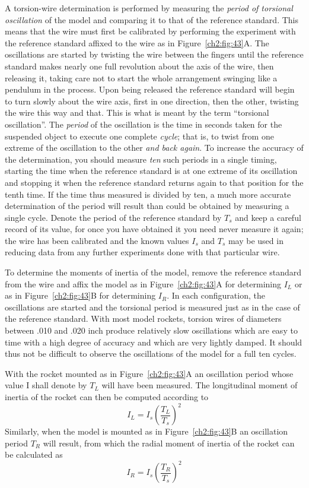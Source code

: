 A torsion-wire determination is performed by measuring the \emph{period of
torsional oscillation} of the model and comparing it to that of the reference
standard. This means that the wire must first be calibrated by performing the
experiment with the reference standard affixed to the wire as in
Figure~\ref{ch2:fig:43}A. The oscillations are started by twisting the wire
between the fingers until the reference standard makes nearly one full
revolution about the axis of the wire, then releasing it, taking care not to
start the whole arrangement swinging like a pendulum in the process. Upon
being released the reference standard will begin to turn slowly about the wire
axis, first in one direction, then the other, twisting the wire this way and
that. This is what is meant by the term ``torsional oscillation''. The
\emph{period} of the oscillation is the time in seconds taken for the
suspended object to execute one complete \emph{cycle}; that is, to twist from
one extreme of the oscillation to the other \emph{and back again}. To increase
the accuracy of the determination, you should measure \emph{ten} such periods
in a single timing, starting the time when the reference standard is at one
extreme of its oscillation and stopping it when the reference standard returns
again to that position for the tenth time. If the time thus measured is
divided by ten, a much more accurate determination of the period will result
than could be obtained by measuring a single cycle. Denote the period of the
reference standard by $T_s$ and keep a careful record of its value, for once
you have obtained it you need never measure it again; the wire has been
calibrated and the known values $I_s$ and $T_s$ may be used in reducing data
from any further experiments done with that particular wire.

To determine the moments of inertia of the model, remove the reference
standard from the wire and affix the model as in Figure~\ref{ch2:fig:43}A for
determining $I_L$ or as in Figure~\ref{ch2:fig:43}B for determining $I_R$. In
each configuration, the oscillations are started and the torsional period is
measured just as in the case of the reference standard. With most model
rockets, torsion wires of diameters between .010 and .020 inch produce
relatively slow oscillations which are easy to time with a high degree of
accuracy and which are very lightly damped. It should thus not be difficult to
observe the oscillations of the model for a full ten cycles.

With the rocket mounted as in Figure~\ref{ch2:fig:43}A an oscillation period
whose value I shall denote by $T_L$ will have been measured. The longitudinal
moment of inertia of the rocket can then be computed according to
\begin{equation}\label{ch2:eq:111}
I_L = I_s \left(\frac{T_L}{T_s}\right)^{2}
\end{equation}
Similarly, when the model is mounted as in Figure~\ref{ch2:fig:43}B an
oscillation period $T_R$ will result, from which the radial moment of inertia
of the rocket can be calculated as
\begin{equation}\label{ch2:eq:112}
I_R = I_s \left(\frac{T_R}{T_s}\right)^{2}
\end{equation}

